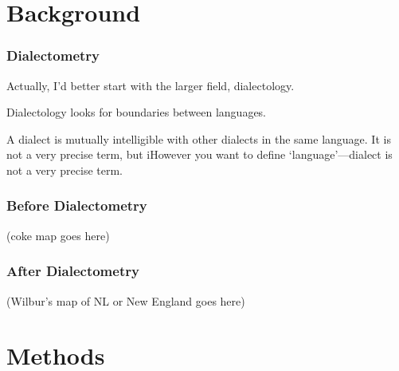 \documentclass{beamer}
\begin{document}
\section{Background}
\begin{frame}
  \frametitle{Dialectometry}
  Actually, I'd better start with the larger field, dialectology.
  \begin{definition}
    Dialectology looks for boundaries between languages. 
  \end{definition}
  \begin{definition}
    A dialect is mutually intelligible with other dialects in the same
    language. It is not a very precise term, but iHowever you
    want to define `language'---dialect is not a very precise term.
  \end{definition}
\end{frame}
\begin{frame}
  \frametitle{Before Dialectometry}
  (coke map goes here)
\end{frame}
\begin{frame}
  \frametitle{After Dialectometry}
  (Wilbur's map of NL or New England goes here)
\end{frame}
\section{Methods}
\end{document}
